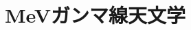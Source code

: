 \def\PicPath{/Users/ken/Documents/shuron/chapter1}
\chapter{MeVガンマ線天文学}
\begin{comment}
天文学は可視光から電波・赤外線・X線と様々な波長の電磁波の観測を行うことで発展してきた。さらに今日では陽子を主とする宇宙線やニュートリノなどの観測も行われる様になり、観測によって得ることが可能な宇宙の情報はより豊かになった。

宇宙の情報を得る手段の一つとしてガンマ線観測が挙げられる。ガンマ線とは数百keV以上のエネルギーを持つ電磁波を指す。1950年代に早川らにより、宇宙線と星間物質との相互作用で作られる$\pi^{0}$中間子の崩壊によってガンマ線が放射されることが予言されて以来1967年にOSO-3($\geq$ 50$\ $kev)、1972年にSAS-2(20\ MeV $\sim$ 1$\ $GeV)、1975年にCOS-B(2 $\ $keV $\sim$ 5$\ $GeV)と、次々とガンマ線観測衛星が打ち上げられ、多くのガンマ線天体を発見している。また、sub-MeV$\sim$数十MeVまでの低エネルギーガンマ線では、1989年にGRANT衛星がロシア、フランスによって、1991年にCGRO衛星がアメリカによって打ち上げられている。近年は20022年に硬X線を観測するINTEGRAL、2004年にガンマ線バーストを観測するSWIFT、2008年にGeV領域を観測するFermiが打ち上げられ、観測を続けている。地上では1990年代からWhipple、CANGAROOなどのCherenkov望遠鏡によって非常にエネルギーの高いTeVガンマ線領域の観測が始まっており、現在でもステレオ方式のHESS、MAGIC等によって次々と新しいガンマ線天体が発見されている。

MeV領域のガンマ線は元素合成や粒子加速、宇宙線と星間物質との相互作用といった情報を提供する。また、MeVガンマ線は高エネルギーガンマ線とは異なり、最遠方の初期宇宙から地球までほとんど減衰することはない。そのため、初期宇宙の激しい星の生成、消滅などの観測が期待されるユニークなガンマ線である。しかし、一方で地球の大気には吸収されるため、MeVガンマ線の観測は大気外に出る必要がある。(図\ref{fig:atm_absp})
\begin{figure}
\centering
\texttt{[image: \\PicPath/atmosphere\_absorption.png]}
\caption{大気による様々な波長の電磁波の吸収\cite{oda_and_matsuoka}}
\label{fig:atm_absp}
\end{figure}

MeV領域は可視光やX線の領域に比べ、光子数が少なく透過力も高い上、物質との相互作用が主にコンプトン散乱によるので光子の完全な吸収は難しい。さらに銀河面全体に広がったガンマ線放射や、宇宙線と衛星本体との相互作用による大量のバックグラウンドが存在し、観測が非常に困難な領域である。以上の理由から、MeV領域の天文学は、他の波長域に比べ大きく遅れを取っているのが現状である。

この章ではMeVガンマ線領域について簡単に解説し、これまで行われてきたMeVガンマ線観測、そしてMeVガンマ線を観測することでどの様な物理現象の解明に繋がると期待されているかについて述べる。
\end{comment}

